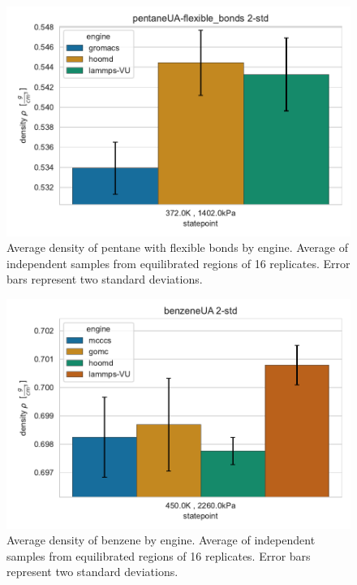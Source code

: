 \begin{figure}[h!]
    \centering
    \includegraphics[width=0.8\linewidth,keepaspectratio]{figures/rep_study/pentaneUA-flexible_bonds_summary_bar_2std.pdf}
    \caption{Average density of pentane with flexible bonds by engine. Average of independent samples from equilibrated regions of 16 replicates. Error bars represent two standard deviations.}\label{fig:pentane_flexible_density}
\end{figure}

\begin{figure}[h!]
    \centering
    \includegraphics[width=0.8\linewidth,keepaspectratio]{figures/rep_study/benzeneUA_summary_bar_2std.pdf}
    \caption{Average density of benzene by engine. Average of independent samples from equilibrated regions of 16 replicates. Error bars represent two standard deviations.}\label{fig:benzene_density}
\end{figure}

